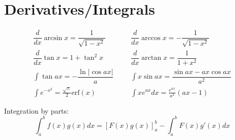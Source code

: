 \section{Derivatives/Integrals}
\begin{align*}
     \dfrac{d}{dx}\arcsin x = \dfrac{1}{\sqrt{1-x^2}}  &  &  & \dfrac{d}{dx}\arccos x = -\dfrac{1}{\sqrt{1-x^2}} \\
     \dfrac{d}{dx}\tan x = 1+\tan^2 x                  &  &  & \dfrac{d}{dx}\arctan x = \dfrac{1}{1+x^2}         \\
     \int\tan ax = -\dfrac{\ln|\cos ax|}{a}            &  &  & \int x\sin ax = \dfrac{\sin ax-ax \cos ax}{a^2}   \\
     \int e^{-x^2} = \frac{\sqrt \pi}{2} \text{erf}(x) &  &  & \int xe^{ax}dx = \frac{e^{ax}}{a^2}(ax-1)
\end{align*}

Integration by parts:
\[\int_a^bf(x)g(x)dx = [F(x)g(x)]_a^b-\int_a^bF(x)g'(x)dx\]

